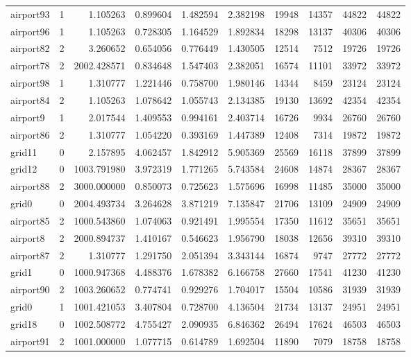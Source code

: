 \begin{longtable}{|l|r|r|r|r|r|r|r|r|r|}
airport93 & 1 & 1.105263 & 0.899604 & 1.482594 & 2.382198 & 19948 & 14357 & 44822 & 44822 \\
airport96 & 1 & 1.105263 & 0.728305 & 1.164529 & 1.892834 & 18298 & 13137 & 40306 & 40306 \\
airport82 & 2 & 3.260652 & 0.654056 & 0.776449 & 1.430505 & 12514 & 7512 & 19726 & 19726 \\
airport78 & 2 & 2002.428571 & 0.834648 & 1.547403 & 2.382051 & 16574 & 11101 & 33972 & 33972 \\
airport98 & 1 & 1.310777 & 1.221446 & 0.758700 & 1.980146 & 14344 & 8459 & 23124 & 23124 \\
airport84 & 2 & 1.105263 & 1.078642 & 1.055743 & 2.134385 & 19130 & 13692 & 42354 & 42354 \\
airport9 & 1 & 2.017544 & 1.409553 & 0.994161 & 2.403714 & 16726 & 9934 & 26760 & 26760 \\
airport86 & 2 & 1.310777 & 1.054220 & 0.393169 & 1.447389 & 12408 & 7314 & 19872 & 19872 \\
grid11 & 0 & 2.157895 & 4.062457 & 1.842912 & 5.905369 & 25569 & 16118 & 37899 & 37899 \\
grid12 & 0 & 1003.791980 & 3.972319 & 1.771265 & 5.743584 & 24608 & 14874 & 28367 & 28367 \\
airport88 & 2 & 3000.000000 & 0.850073 & 0.725623 & 1.575696 & 16998 & 11485 & 35000 & 35000 \\
grid0 & 0 & 2004.493734 & 3.264628 & 3.871219 & 7.135847 & 21706 & 13109 & 24909 & 24909 \\
airport85 & 2 & 1000.543860 & 1.074063 & 0.921491 & 1.995554 & 17350 & 11612 & 35651 & 35651 \\
airport8 & 2 & 2000.894737 & 1.410167 & 0.546623 & 1.956790 & 18038 & 12656 & 39310 & 39310 \\
airport87 & 2 & 1.310777 & 1.291750 & 2.051394 & 3.343144 & 16874 & 9747 & 27772 & 27772 \\
grid1 & 0 & 1000.947368 & 4.488376 & 1.678382 & 6.166758 & 27660 & 17541 & 41230 & 41230 \\
airport90 & 2 & 1003.260652 & 0.774741 & 0.929276 & 1.704017 & 15504 & 10586 & 31939 & 31939 \\
grid0 & 1 & 1001.421053 & 3.407804 & 0.728700 & 4.136504 & 21734 & 13137 & 24951 & 24951 \\
grid18 & 0 & 1002.508772 & 4.755427 & 2.090935 & 6.846362 & 26494 & 17624 & 46503 & 46503 \\
airport91 & 2 & 1001.000000 & 1.077715 & 0.614789 & 1.692504 & 11890 & 7079 & 18758 & 18758 \\

\end{longtable}
